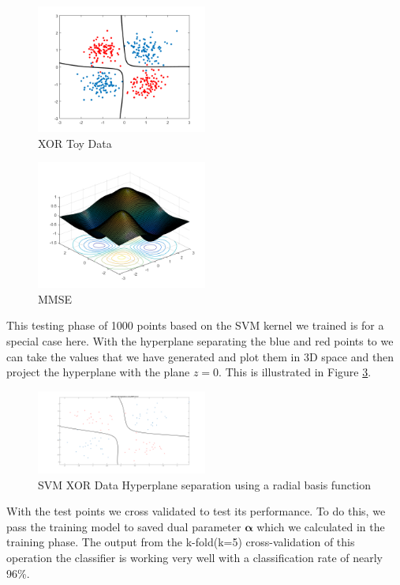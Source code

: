 \documentclass[conference]{IEEEtran}
\begin{document}
\begin{figure}[ht!]
\centering
\includegraphics[width=0.5\textwidth]{figs/XOR.png}
\caption{XOR Toy Data}
\label{fig:XOR} 
\end{figure}

\begin{figure}[ht!]
\includegraphics[width=0.5\textwidth]{figs/MMSE.png}
\caption{MMSE}
\label{fig:MMSE} 
\end{figure}

This testing phase of 1000 points based on the SVM kernel we trained is for a special case here. With the hyperplane separating the blue and red points to  
we can take the values that we have generated and plot them in 3D space and then project the hyperplane with the plane $ z=0$. This is illustrated
in Figure \ref{fig:SVM_XOR_HYP}.

\begin{figure}[ht!]
\centering
\includegraphics[width=0.5\textwidth]{figs/SVM_XOR_HYP.png}
\caption{SVM XOR Data Hyperplane separation using a radial basis function}
\label{fig:SVM_XOR_HYP} 
\end{figure}

With the test points we cross validated to test its performance. To do this, we pass the training model to saved dual parameter $\bm{\alpha}$ which we calculated in the training phase. The output from the k-fold(k=5) cross-validation of this operation the classifier is working very well with a classification rate of nearly 96\%. 
\end{document}

